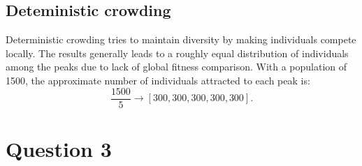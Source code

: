 \documentclass[12pt,letterpaper]{article}
\begin{document}
\subsection*{Deteministic crowding}
Deterministic crowding tries to maintain diversity by making individuals compete locally. 
The results generally leads to a roughly equal distribution of individuals among the peaks due to lack of global fitness comparison.
With a population of 1500, the approximate number of individuals attracted to each peak is:
\[
\frac{1500}{5} \rightarrow \left[300, 300, 300, 300, 300\right].
\]

\section*{Question 3}
\end{document}
